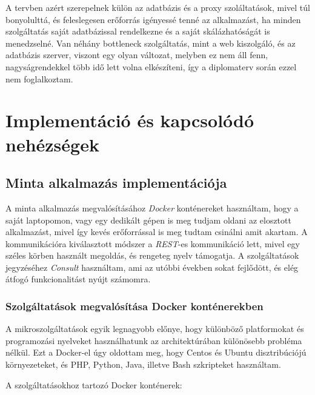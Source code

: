 \documentclass[11pt,magyar,a4paper,twoside,]{report}
\begin{document}
A tervben azért szerepelnek külön az adatbázis és a proxy szoláltatások,
mivel túl bonyolulttá, és feleslegesen erőforrás igényessé tenné az
alkalmazást, ha minden szolgáltatás saját adatbázissal rendelkezne és a
saját skálázhatóságát is menedzselné. Van néhány bottleneck
szolgáltatás, mint a web kiszolgáló, és az adatbázis szerver, viszont
egy olyan változat, melyben ez nem áll fenn, nagyságrendekkel több idő
lett volna elkészíteni, így a diplomaterv során ezzel nem foglalkoztam.

\chapter{Implementáció és kapcsolódó
nehézségek}\label{implementuxe1ciuxf3-uxe9s-kapcsoluxf3duxf3-nehuxe9zsuxe9gek}

\section{Minta alkalmazás
implementációja}\label{minta-alkalmazuxe1s-implementuxe1ciuxf3ja}

A minta alkalmazás megvalósításához \emph{Docker} konténereket
használtam, hogy a saját laptopomon, vagy egy dedikált gépen is meg
tudjam oldani az elosztott alkalmazást, mivel így kevés erőforrással is
meg tudtam csinálni amit akartam. A kommunikációra kiválasztott módszer
a \emph{REST}-es kommunikáció lett, mivel egy széles körben használt
megoldás, és rengeteg nyelv támogatja. A szolgáltatások jegyzéséhez
\emph{Consult} használtam, ami az utóbbi években sokat fejlődött, és
elég átfogó funkcionalitást nyújt számomra.

\subsection{Szolgáltatások megvalósítása Docker
konténerekben}\label{szolguxe1ltatuxe1sok-megvaluxf3suxedtuxe1sa-docker-kontuxe9nerekben}

A mikroszolgáltatások egyik legnagyobb előnye, hogy különböző
platformokat és programozási nyelveket használhatunk az architektúrában
különösebb probléma nélkül. Ezt a Docker-el úgy oldottam meg, hogy
Centos és Ubuntu disztribúciójú környezeteket, és PHP, Python, Java,
illetve Bash szkripteket használtam.

A szolgáltatásokhoz tartozó Docker konténerek:
\end{document}
